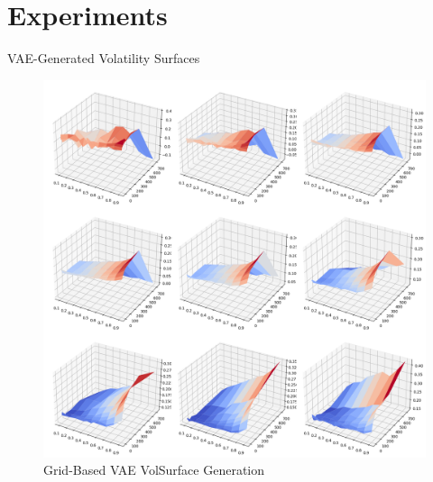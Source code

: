 \documentclass{beamer}
\begin{document}

\section{Experiments}

\begin{frame}{VAE-Generated Volatility Surfaces}
\begin{figure}
    \centering
    \includegraphics[width=0.6\linewidth]{docs/slides/img/vae_grid_plot_from_5.png}
    \caption{Grid-Based VAE VolSurface Generation}
    \label{fig:enter-label}
\end{figure}
\end{frame}
\end{document}
